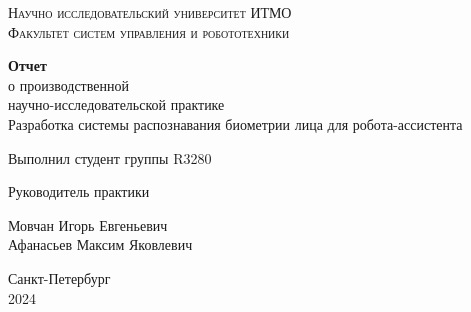 \documentclass[a4paper,hidelinks,14pt]{extarticle}
\begin{document}
	\begin{titlepage}
		\setlength{\parindent}{0ex}
		
		\begin{center}
			\textsc{
				\vspace{1ex}
				Научно исследовательский университет ИТМО \\
				\vspace{0.5ex}
				Факультет систем управления и робототехники \\
				\vspace{0.5ex}
			}
		\end{center}
		
		\vspace{25mm}
		
		\begin{center}
			\large\textbf{Отчет} \\
			о производственной  \\
			научно-исследовательской практике \\
			\vspace{5mm}
			Разработка системы распознавания биометрии лица для робота-ассистента
		\end{center}
		
		\vspace{40mm}
		
		\begin{minipage}{.49\linewidth}
			Выполнил студент группы R3280
			
			Руководитель практики
		\end{minipage}
		\hfill
		\begin{minipage}{.5\linewidth}
			\begin{flushright}
				Мовчан Игорь Евгеньевич
				\\
				 Афанасьев Максим Яковлевич
			\end{flushright}
		\end{minipage}
		\vfill
		\begin{center}
			Санкт-Петербург
			\\
			2024
		\end{center}
		
	\newpage
	\thispagestyle{nofooter}
	\tableofcontents
	
	\end{titlepage}
	
\end{document}
